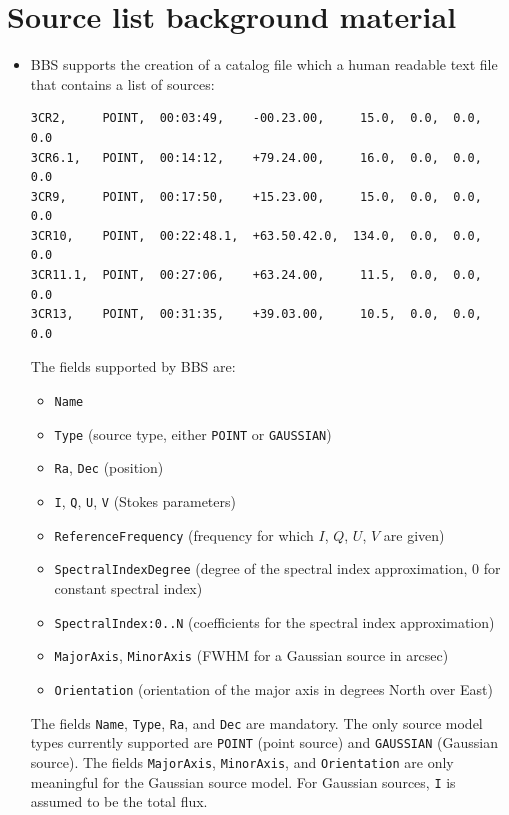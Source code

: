 \documentclass[a4paper,10pt,bibtotoc]{scrartcl}
\begin{document}
\section{Source list background material}
\label{sec:examples sources}

\begin{itemize}
\item BBS supports the creation of a catalog file which a human readable text file that contains a list of sources:
\begin{verbatim}
3CR2,     POINT,  00:03:49,    -00.23.00,     15.0,  0.0,  0.0,  0.0
3CR6.1,   POINT,  00:14:12,    +79.24.00,     16.0,  0.0,  0.0,  0.0
3CR9,     POINT,  00:17:50,    +15.23.00,     15.0,  0.0,  0.0,  0.0
3CR10,    POINT,  00:22:48.1,  +63.50.42.0,  134.0,  0.0,  0.0,  0.0
3CR11.1,  POINT,  00:27:06,    +63.24.00,     11.5,  0.0,  0.0,  0.0
3CR13,    POINT,  00:31:35,    +39.03.00,     10.5,  0.0,  0.0,  0.0
\end{verbatim}
  The fields supported by BBS are:
  \begin{itemize}
  \item \texttt{Name}
  \item \texttt{Type} (source type, either \texttt{POINT} or \texttt{GAUSSIAN})
  \item \texttt{Ra}, \texttt{Dec} (position)
  \item \texttt{I}, \texttt{Q}, \texttt{U}, \texttt{V} (Stokes parameters)
  \item \texttt{ReferenceFrequency} (frequency for which $I$, $Q$, $U$, $V$ are given)
  \item \texttt{SpectralIndexDegree} (degree of the spectral index approximation, 0 for constant spectral index)
  \item \texttt{SpectralIndex:0..N} (coefficients for the spectral index approximation)
  \item \texttt{MajorAxis}, \texttt{MinorAxis} (FWHM for a Gaussian source in arcsec)
  \item \texttt{Orientation} (orientation of the major axis in degrees North over East)
  \end{itemize}
  The fields \texttt{Name}, \texttt{Type}, \texttt{Ra}, and \texttt{Dec} are mandatory. The only source model types currently supported are \texttt{POINT} (point source) and \texttt{GAUSSIAN} (Gaussian source). The fields \texttt{MajorAxis}, \texttt{MinorAxis}, and \texttt{Orientation} are only meaningful for the Gaussian source model. For Gaussian sources, \texttt{I} is assumed to be the total flux. 

\end{itemize}
\end{document}
